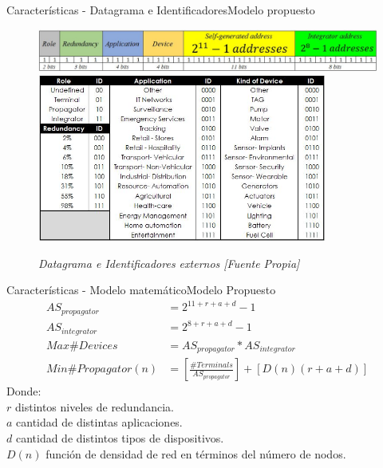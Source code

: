 \begin{frame}{Características - Datagrama e Identificadores}{Modelo propuesto}	
    \begin{figure}				
		\includegraphics[width=\textwidth,height=0.7\textheight,keepaspectratio]{Figures/Datagram2.JPG}
\\
		\includegraphics[width=0.85\textwidth,height=0.85\textheight,keepaspectratio]{Figures/IDs.JPG}
		\caption{\small \sl Datagrama e Identificadores externos [Fuente Propia]}
		\label{figure:Identifiers}
    \end{figure}
\end{frame}
\begin{frame}{Características - Modelo matemático}{Modelo Propuesto}	
\begin{align}
AS_{propagator} &= 2^{11+r+a+d}-1  \label{eqn1}\\
AS_{integrator} &= 2^{8+r+a+d}-1  \label{eqn2}\\
Max \# Devices &= AS_{propagator}*AS_{integrator}  \label{eqn3}\\
Min \# Propagator(n) &= \left[ \frac{\# Terminals}{AS_{propagator}} \right ] + \left[D(n)(r+a+d) \right ] \label{eqn4}
\end{align}
Donde:\\
$r$ distintos niveles de redundancia.\\
$a$ cantidad de distintas aplicaciones.\\
$d$ cantidad de distintos tipos de dispositivos.\\
$D(n)$ función de densidad de red en términos del número de nodos.\\
\end{frame}
